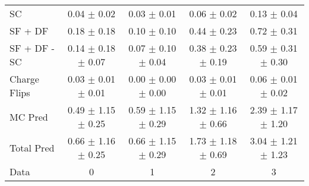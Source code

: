 \begin{tabular}{l|cccc}
                                 SC &  0.04 $\pm$  0.02 &  0.03 $\pm$  0.01 &  0.06 $\pm$  0.02 &  0.13 $\pm$  0.04 \\
                            SF + DF &  0.18 $\pm$  0.18 &  0.10 $\pm$  0.10 &  0.44 $\pm$  0.23 &  0.72 $\pm$  0.31 \\
\hline
                       SF + DF - SC &  0.14 $\pm$  0.18 $\pm$  0.07 &  0.07 $\pm$  0.10 $\pm$  0.04 &  0.38 $\pm$  0.23 $\pm$  0.19 &  0.59 $\pm$  0.31 $\pm$  0.30 \\
\hline\hline
                       Charge Flips &  0.03 $\pm$  0.01 $\pm$  0.01 &  0.00 $\pm$  0.00 $\pm$  0.00 &  0.03 $\pm$  0.01 $\pm$  0.01 &  0.06 $\pm$  0.01 $\pm$  0.02 \\
\hline
                            MC Pred &  0.49 $\pm$  1.15 $\pm$  0.25 &  0.59 $\pm$  1.15 $\pm$  0.29 &  1.32 $\pm$  1.16 $\pm$  0.66 &  2.39 $\pm$  1.17 $\pm$  1.20 \\
\hline
                         Total Pred &  0.66 $\pm$  1.16 $\pm$  0.25 &  0.66 $\pm$  1.15 $\pm$  0.29 &  1.73 $\pm$  1.18 $\pm$  0.69 &  3.04 $\pm$  1.21 $\pm$  1.23 \\
\hline\hline
                               Data &     0 &     1 &     2 &     3 \\
\hline\hline
\end{tabular}

